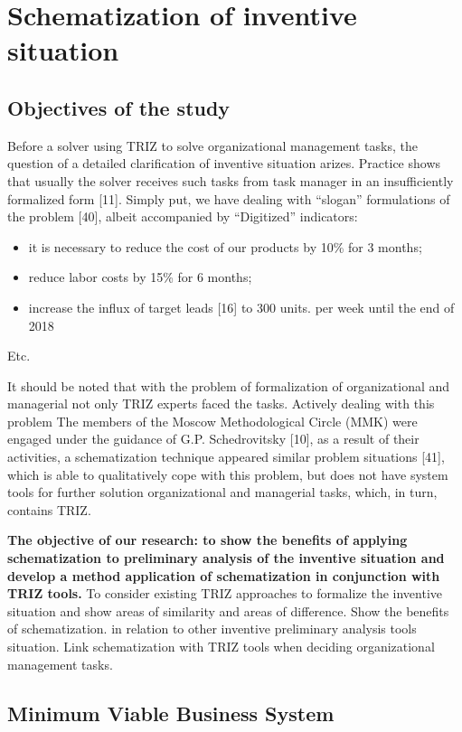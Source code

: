 \chapter{Schematization of inventive situation}

\section{Objectives of the study}

Before a solver using TRIZ to solve organizational management tasks, the
question of a detailed clarification of inventive situation arizes. Practice
shows that usually the solver receives such tasks from task manager in an
insufficiently formalized form [11]. Simply put, we have dealing with “slogan”
formulations of the problem [40], albeit accompanied by “Digitized”
indicators:
\begin{itemize}
\item it is necessary to reduce the cost of our products by 10\% for 3 months;
\item reduce labor costs by 15\% for 6 months;
\item increase the influx of target leads [16] to 300 units. per week until
  the end of 2018
\end{itemize}
Etc.

It should be noted that with the problem of formalization of organizational
and managerial not only TRIZ experts faced the tasks. Actively dealing with
this problem The members of the Moscow Methodological Circle (MMK) were
engaged under the guidance of G.P.  Schedrovitsky [10], as a result of their
activities, a schematization technique appeared similar problem situations
[41], which is able to qualitatively cope with this problem, but does not have
system tools for further solution organizational and managerial tasks, which,
in turn, contains TRIZ.

\textbf{The objective of our research: to show the benefits of applying
  schematization to preliminary analysis of the inventive situation and
  develop a method application of schematization in conjunction with TRIZ
  tools.}  To consider existing TRIZ approaches to formalize the inventive
situation and show areas of similarity and areas of difference. Show the
benefits of schematization.  in relation to other inventive preliminary
analysis tools situation. Link schematization with TRIZ tools when deciding
organizational management tasks.

\section{Minimum Viable Business System}

